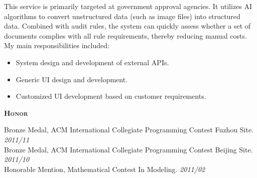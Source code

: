 \documentclass[a4paper]{article}
\newenvironment{changemargin}[2]{%
  \begin{list}{}{%
    \setlength{\topsep}{0pt}%
    \setlength{\leftmargin}{#1}%
    \setlength{\rightmargin}{#2}%
    \setlength{\listparindent}{\parindent}%
    \setlength{\itemindent}{\parindent}%
    \setlength{\parsep}{\parskip}%
  }%
  \item[]}{\end{list}
}
\newcommand{\lineover}{
	\begin{changemargin}{-0.05in}{-0.05in}
		\vspace*{-8pt}
		\hrulefill \\
		\vspace*{-2pt}
	\end{changemargin}
}
\newcommand{\header}[1]{
	\begin{changemargin}{-0.5in}{-0.5in}
		\scshape{\large \textbf{#1}}\\
	\end{changemargin}
}
\newenvironment{body} {
	\vspace*{-16pt}
	\begin{changemargin}{-0.5in}{-0.5in}
  }
	{\end{changemargin}
}
\begin{document}
\begin{body}
	\begin{justify} 
	 	This service is primarily targeted at government approval agencies. It utilizes AI algorithms to convert unstructured data (such as image files) into structured data. Combined with audit rules, the system can quickly assess whether a set of documents complies with all rule requirements, thereby reducing manual costs. My main responsibilities included:
	\end{justify}
	\smallskip

	\vspace*{-8pt}
	\begin{itemize} \itemsep -0pt  %
		\item \begin{justify} 
			System design and development of external APIs.
		\end{justify} 
	\end{itemize}

	\vspace*{-8pt}
	\begin{itemize} \itemsep -0pt  %
		\item \begin{justify} 
			Generic UI design and development.
		\end{justify} 
	\end{itemize}

	\vspace*{-8pt}
	\begin{itemize} \itemsep -0pt  %
		\item \begin{justify} 
			Customized UI development based on customer requirements.
		\end{justify} 
	\end{itemize}

\end{body}
\medskip

\header{Honor}
\begin{body}
	\vspace{16pt}
	Bronze Medal, ACM International Collegiate Programming Contest Fuzhou Site. \hfill \emph{2011/11}\\
	Bronze Medal, ACM International Collegiate Programming Contest Beijing Site. \hfill \emph{2011/10}\\
	Honorable Mention, Mathematical Contest In Modeling. \hfill \emph{2011/02}\\
\end{body}
\end{document}
